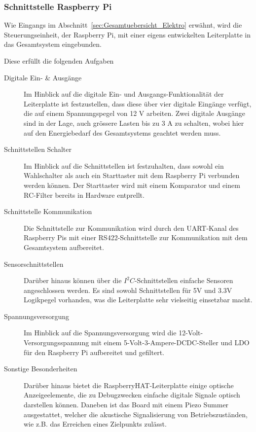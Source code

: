 \documentclass[main.tex]{subfiles} %
\begin{document}

\subsubsection{Schnittstelle Raspberry Pi}
Wie Eingangs im Abschnitt~\ref{sec:Gesamtuebersicht_Elektro} erwähnt, wird die
Steuerungseinheit, der Raspberry Pi, mit einer eigens entwickelten Leiterplatte
in das Gesamtsystem eingebunden.

Diese erfüllt die folgenden Aufgaben

\begin{description}
      \item[Digitale Ein- \& Ausgänge] Im Hinblick auf die digitale Ein- und
            Ausgangs-Funktionalität der Leiterplatte ist festzustellen, dass diese über
            vier digitale Eingänge verfügt, die auf einem Spannungspegel von 12 V arbeiten.
            Zwei digitale Ausgänge sind in der Lage, auch grössere Lasten bis zu 3 A zu
            schalten, wobei hier auf den Energiebedarf des Gesamtsystems geachtet werden
            muss.
      \item[Schnittstellen Schalter] Im Hinblick auf die Schnittstellen ist festzuhalten,
            dass sowohl ein Wahlschalter als auch ein Starttaster mit dem Raspberry Pi
            verbunden werden können. Der Starttaster wird mit einem Komparator und einem
            RC-Filter bereits in Hardware entprellt.
      \item[Schnittstelle Kommunikation] Die Schnittstelle zur Kommunikation wird durch den
            UART-Kanal des Raspberry Pis mit einer RS422-Schnittstelle zur Kommunikation
            mit dem Gesamtsystem aufbereitet.
      \item[Sensorschnittstellen] Darüber hinaus können über die $I^2C$-Schnittstellen
            einfache Sensoren angeschlossen werden. Es sind sowohl Schnittstellen für 5V
            und 3.3V Logikpegel vorhanden, was die Leiterplatte sehr vielseitig einsetzbar
            macht.
      \item[Spannungsversorgung] Im Hinblick auf die Spannungsversorgung wird die
            12-Volt-Versorgungsspannung mit einem 5-Volt-3-Ampere-DCDC-Steller und LDO für
            den Raspberry Pi aufbereitet und gefiltert.
      \item[Sonstige Besonderheiten] Darüber hinaus bietet die RaspberryHAT-Leiterplatte
            einige optische Anzeigeelemente, die zu Debugzwecken einfache digitale Signale
            optisch darstellen können. Daneben ist das Board mit einem Piezo Summer
            ausgestattet, welcher die akustische Signalisierung von Betriebszuständen, wie
            z.B. das Erreichen eines Zielpunkts zulässt.
\end{description}
\end{document}
